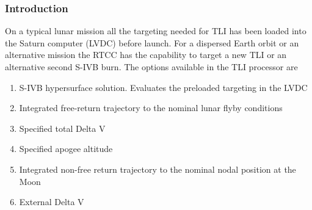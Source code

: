 \documentclass[11pt]{article} %
\begin{document}
\subsubsection{Introduction}
On a typical lunar mission all the targeting needed for TLI has been loaded into the Saturn computer (LVDC) before launch. For a dispersed Earth orbit or an alternative mission the RTCC has the capability to target a new TLI or an alternative second S-IVB burn. The options available in the TLI processor are

\begin{enumerate}
	\item S-IVB hypersurface solution. Evaluates the preloaded targeting in the LVDC
	\item Integrated free-return trajectory to the nominal lunar flyby conditions
	\item Specified total Delta V
	\item Specified apogee altitude
	\item Integrated non-free return trajectory to the nominal nodal position at the Moon
	\item External Delta V
\end{enumerate}
\end{document}
